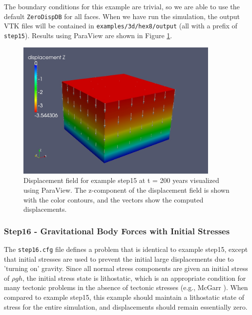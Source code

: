 The boundary conditions for this example are trivial, so we are able
to use the default \texttt{ZeroDispDB} for all faces. When we have
run the simulation, the output VTK files will be contained in \texttt{examples/3d/hex8/output}
(all with a prefix of \texttt{step15}). Results using ParaView are
shown in Figure \ref{fig:step15-displ-t200}.

\begin{figure}
\begin{centering}
\includegraphics[width=10cm]{tutorials/3dhex8/figs/step15-displ-t200}
\par\end{centering}

\caption{Displacement field for example step15 at t = 200 years visualized
using ParaView. The z-component of the displacement field is shown
with the color contours, and the vectors show the computed displacements.\label{fig:step15-displ-t200}}


\end{figure}



\subsubsection{Step16 - Gravitational Body Forces with Initial Stresses}

The \texttt{step16.cfg} file defines a problem that is identical to
example step15, except that initial stresses are used to prevent the
initial large displacements due to 'turning on' gravity. Since all
normal stress components are given an initial stress of $\rho gh$,
the initial stress state is lithostatic, which is an appropriate condition
for many tectonic problems in the absence of tectonic stresses (e.g.,
McGarr \cite{McGarr:1988}). When compared to example step15, this
example should maintain a lithostatic state of stress for the entire
simulation, and displacements should remain essentially zero.

